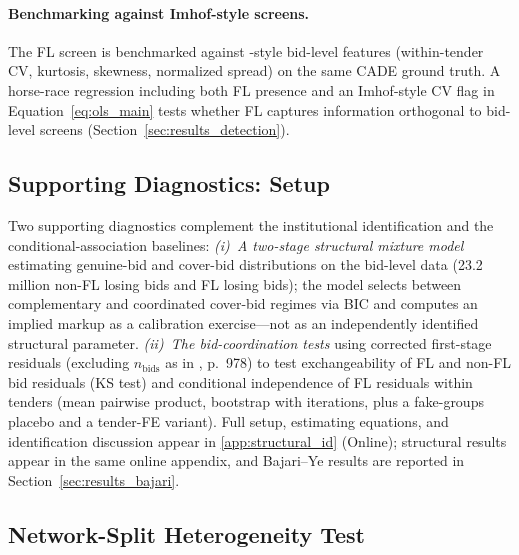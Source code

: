 \paragraph{Benchmarking against Imhof-style screens.}
The FL screen is benchmarked against \citet{imhof2019detecting}-style
bid-level features (within-tender CV, kurtosis, skewness, normalized
spread) on the same CADE ground truth. A horse-race regression
including both FL presence and an Imhof-style CV flag in
Equation~\eqref{eq:ols_main} tests whether FL captures information
orthogonal to bid-level screens
(Section~\ref{sec:results_detection}).


\subsection{Supporting Diagnostics: Setup}
\label{sec:supporting_setup}

Two supporting diagnostics complement the institutional
identification and the conditional-association baselines:
\textit{(i)~A two-stage structural mixture model} estimating
genuine-bid and cover-bid distributions on the bid-level data
(23.2 million non-FL losing bids and \valItemsCount FL losing bids);
the model selects between complementary and coordinated cover-bid
regimes via BIC and computes an implied markup as a calibration
exercise---not as an independently identified structural
parameter. \textit{(ii)~The \citet{bajari2003deciding}
bid-coordination tests} using corrected first-stage residuals
(excluding $n_{\text{bids}}$ as in \citealt{bajari2003deciding},
p.~978) to test exchangeability of FL and non-FL bid residuals
(KS test) and conditional independence of FL residuals within
tenders (mean pairwise product, bootstrap with \valPermPilot iterations,
plus a fake-groups placebo and a tender-FE variant). Full setup,
estimating equations, and identification discussion appear in
\ref{app:structural_id} (Online); structural results appear in
the same online appendix, and Bajari--Ye results are reported in
Section~\ref{sec:results_bajari}.


\subsection{Network-Split Heterogeneity Test}
\label{sec:empirical_network}

